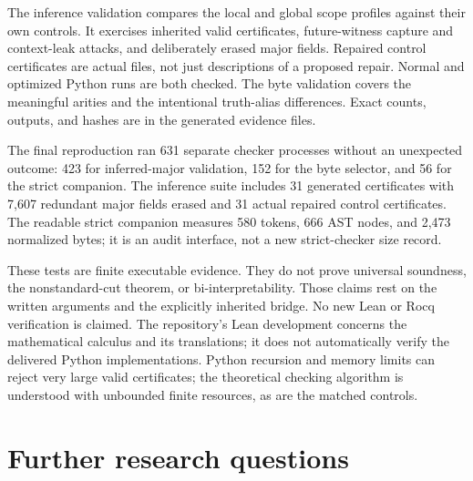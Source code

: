 \documentclass[11pt]{article}
\theoremstyle{definition}
\theoremstyle{remark}
\begin{document}
The inference validation compares the local and global scope profiles
against their own controls.  It exercises inherited valid certificates,
future-witness capture and context-leak attacks, and deliberately erased
major fields.  Repaired control certificates are actual files, not just
descriptions of a proposed repair.  Normal and optimized Python runs are
both checked.  The byte validation covers the meaningful arities and
the intentional truth-alias differences.  Exact counts, outputs, and
hashes are in the generated evidence files.

The final reproduction ran 631 separate checker processes without an
unexpected outcome: 423 for inferred-major validation, 152 for the byte
selector, and 56 for the strict companion.  The inference suite includes
31 generated certificates with 7,607 redundant major fields erased and
31 actual repaired control certificates.  The readable strict companion
measures 580 tokens, 666 AST nodes, and 2,473 normalized bytes; it is an
audit interface, not a new strict-checker size record.

These tests are finite executable evidence.  They do not prove universal
soundness, the nonstandard-cut theorem, or bi-interpretability.  Those
claims rest on the written arguments and the explicitly inherited bridge.
No new Lean or Rocq verification is claimed.  The repository's Lean
development concerns the mathematical calculus and its translations; it
does not automatically verify the delivered Python implementations.
Python recursion and memory limits can reject very large valid certificates;
the theoretical checking algorithm is understood with unbounded finite
resources, as are the matched controls.

\section{Further research questions}
\end{document}
